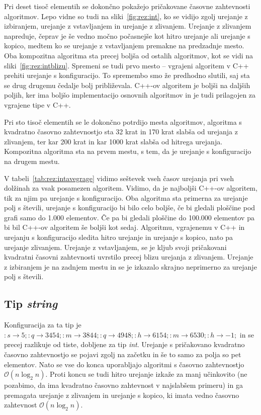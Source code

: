 \documentclass[a4paper,oneside,12pt]{article}
\newcommand{\lra}{\ensuremath{\longrightarrow}}
\begin{document}
Pri deset tisoč elementih se dokončno pokažejo pričakovane časovne zahtevnosti
algoritmov. Lepo vidne so tudi na sliki~\ref{fig:rez:int}, ko se vidijo zgolj
urejanje z izbiranjem, urejanje z vstavljanjem in urejanje z zlivanjem.
Urejanje z zlivanjem napreduje, čeprav je še vedno močno počasnejše kot hitro urejanje ali
urejanje s kopico, medtem ko se urejanje z vstavljanjem premakne na predzadnje 
mesto. Oba kompozitna algoritma sta precej boljša od ostalih algoritmov, kot se
vidi na sliki~\ref{fig:rez:intblizu}. Spremeni se tudi prvo mesto -- vgrajeni algoritem v C++
prehiti urejanje s konfiguracijo. To spremembo smo že predhodno slutili, saj sta
se drug drugemu čedalje bolj približevala. C++-ov algoritem je boljši na daljših
poljih, ker ima boljšo implementacijo osnovnih algoritmov in je tudi
prilagojen za vgrajene tipe v C++. 

Pri sto tisoč elementih se le dokončno potrdijo mesta algoritmov,
algoritma s kvadratno časovno zahtevnostjo sta 32 krat
in 170 krat slabša od urejanja z zlivanjem, ter kar 200 krat in kar 1000 krat slabša od hitrega 
urejanja. Kompozitna algoritma sta na prvem mestu, s tem, da je urejanje s
konfiguracijo na drugem mestu.

V tabeli~\ref{tab:rez:intavegrage} vidimo seštevek vseh časov urejanja pri vseh
dolžinah za vsak posamezen algoritem. Vidimo, da je najboljši C++-ov algoritem,
tik za njim pa urejanje s konfiguracijo. Oba algoritma sta primerna za urejanje
polj s števili, urejanje s konfiguracijo bi bilo celo boljše, če bi gledali
ploščine pod grafi samo do 1.000 elementov. Če pa bi gledali ploščine do 100.000
elementov pa bi bil C++-ov algoritem še boljši kot sedaj. 
Algoritmu, vgrajenemu v C++ in urejanju s konfiguracijo sledita hitro urejanje in urejanje
s kopico, nato pa urejanje zlivanjem. Urejanje z vstavljanjem, se je kljub svoji
pričakovani kvadratni časovni zahtevnosti uvrstilo precej blizu urejanja z
zlivanjem. Urejanje z izbiranjem je na zadnjem mestu in se je izkazalo skrajno 
neprimerno za urejanje polj s števili. 


\subsection{Tip \emph{string}}
Konfiguracija za ta tip je $:s \lra 5;:q \lra 3454;:m \lra 3844;:q \lra 4948;:h
\lra 6154;:m \lra 6530;:h \lra -1;$
in se precej razlikuje od tiste, dobljene za tip \emph{int}. Urejanje
s pričakovano kvadratno časovno zahtevnostjo se pojavi zgolj na začetku in še to samo za 
polja so pet elementov. Nato se vse do konca uporabljajo algoritmi s časovno zahtevnostjo 
$\mathcal{O}(n\log_2n)$. Proti koncu se tudi hitro urejanje izkaže za manj učinkovito (ne 
pozabimo, da ima kvadratno časovno zahtevnost v najslabšem primeru) in ga premagata urejanje
z zlivanjem in urejanje s kopico, ki imata vedno časovno zahtevnost $\mathcal{O}(n\log_2n)$. 
\end{document}
